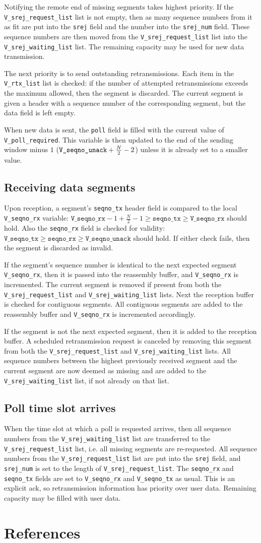 \documentclass[a4paper]{article}
\newcommand{\nr}{\texttt{seqno\_{}rx}}
\newcommand{\ns}{\texttt{seqno\_{}tx}}
\newcommand{\poll}{\texttt{poll}}
\newcommand{\srej}{\texttt{srej}}
\newcommand{\srejnum}{\texttt{srej\_{}num}}
\newcommand{\vr}{\texttt{V\_{}seqno\_{}rx}}
\newcommand{\vs}{\texttt{V\_{}seqno\_{}tx}}
\newcommand{\va}{\texttt{V\_{}seqno\_{}unack}}
\newcommand{\pr}{\texttt{V\_{}poll\_{}required}}
\newcommand{\srejr}{\texttt{V\_{}srej\_{}request\_{}list}}
\newcommand{\srejw}{\texttt{V\_{}srej\_{}waiting\_{}list}}
\newcommand{\rtx}{\texttt{V\_{}rtx\_{}list}}
\begin{document}
		Notifying the remote end of missing segments takes highest priority.
		If the \srejr{} list is not empty, then as many sequence numbers from it as fit are put into the \srej{} field and the number into the \srejnum{} field.
		These sequence numbers are then moved from the \srejr{} list into the \srejw{} list.
		The remaining capacity may be used for new data transmission.
		
		The next priority is to send outstanding retransmissions.
		Each item in the \rtx{} list is checked: if the number of attempted retransmissions exceeds the maximum allowed, then the segment is discarded.
		The current segment is given a header with a sequence number of the corresponding segment, but the data field is left empty.
		
		When new data is sent, the \poll{} field is filled with the current value of \pr{}.
		This variable is then updated to the end of the sending window minus $1$ ($\text{\va} + \frac{N}{2}-2$) unless it is already set to a smaller value.
		
	\subsection{Receiving data segments}\label{sec:arq_receiving}
		Upon reception, a segment's \ns{} header field is compared to the local \vr{} variable: $\vr{} - 1 + \frac{N}{2} - 1 \geq \ns{} \geq \vr{}$ should hold.
		Also the \nr{} field is checked for validity: $\vs{} \geq \nr{} \geq \va{}$ should hold.
		If either check fails, then the segment is discarded as invalid.
		
		If the segment's sequence number is identical to the next expected segment \vr{}, then it is passed into the reassembly buffer, and \vr{} is incremented.
		The current segment is removed if present from both the \srejr{} and \srejw{} lists.
		Next the reception buffer is checked for contiguous segments.
		All contiguous segments are added to the reassembly buffer and \vr{} is incremented accordingly.
		
		If the segment is not the next expected segment, then it is added to the reception buffer.
		A scheduled retransmission request is canceled by removing this segment from both the \srejr{} and \srejw{} lists.
		All sequence numbers between the highest previously received segment and the current segment are now deemed as missing and are added to the \srejw{} list, if not already on that list.
		
	\subsection{Poll time slot arrives}\label{sec:arq_poll}
		When the time slot at which a poll is requested arrives, then all sequence numbers from the \srejw{} list are transferred to the \srejr{} list, i.e. all missing segments are re-requested.
		All sequence numbers from the \srejr{} list are put into the \srej{} field, and \srejnum{} is set to the length of \srejr{}.
		The \nr{} and \ns{} fields are set to \vr{} and \vs{} as usual.
		This is an explicit \ac{ack}, so retransmission information has priority over user data.
		Remaining capacity may be filled with user data.		
			
	\appendix
	\section{References}
		\printbibliography[heading=none]
	
\end{document}
